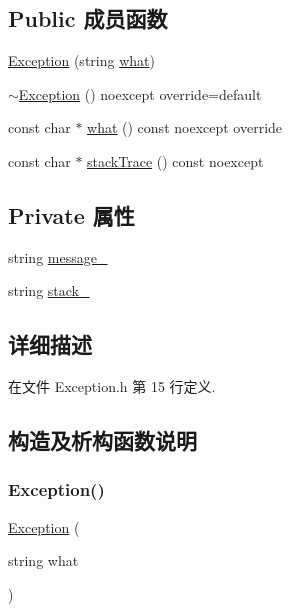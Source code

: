 \subsection*{Public 成员函数}
\begin{DoxyCompactItemize}
\item 
\hyperlink{classmuduo_1_1Exception_a1b3f0eab30f85b8047f60b6f7a9e104a}{Exception} (string \hyperlink{classmuduo_1_1Exception_aac1c33909e01e1dfc85617cf2477d3eb}{what})
\item 
\hyperlink{classmuduo_1_1Exception_aabbe89b00553516449f7cf6346fdcf2e}{$\sim$\+Exception} () noexcept override=default
\item 
const char $\ast$ \hyperlink{classmuduo_1_1Exception_aac1c33909e01e1dfc85617cf2477d3eb}{what} () const noexcept override
\item 
const char $\ast$ \hyperlink{classmuduo_1_1Exception_a9b6db232b385f2ae467e6f0d5ef3eaad}{stack\+Trace} () const noexcept
\end{DoxyCompactItemize}
\subsection*{Private 属性}
\begin{DoxyCompactItemize}
\item 
string \hyperlink{classmuduo_1_1Exception_a44d903a81178bdfff6c6c0c0c72942aa}{message\+\_\+}
\item 
string \hyperlink{classmuduo_1_1Exception_a648d7500eca035b90d3f4653d2bc6164}{stack\+\_\+}
\end{DoxyCompactItemize}


\subsection{详细描述}


在文件 Exception.\+h 第 15 行定义.



\subsection{构造及析构函数说明}
\mbox{\label{classmuduo_1_1Exception_a1b3f0eab30f85b8047f60b6f7a9e104a}} 
\subsubsection{\texorpdfstring{Exception()}{Exception()}}
{\footnotesize\ttfamily \hyperlink{classmuduo_1_1Exception}{Exception} (\begin{DoxyParamCaption}\item[{string}]{what }\end{DoxyParamCaption})}

